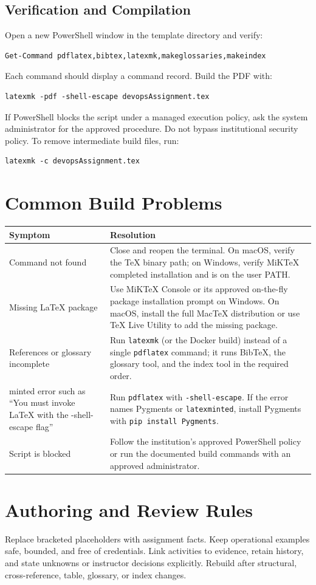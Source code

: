 \subsection{Verification and Compilation}
Open a new PowerShell window in the template directory and verify:
\begin{verbatim}
Get-Command pdflatex,bibtex,latexmk,makeglossaries,makeindex
\end{verbatim}
Each command should display a command record. Build the PDF with:
\begin{verbatim}
latexmk -pdf -shell-escape devopsAssignment.tex
\end{verbatim}
If PowerShell blocks the script under a managed execution policy, ask the
system administrator for the approved procedure. Do not bypass institutional
security policy. To remove intermediate build files, run:
\begin{verbatim}
latexmk -c devopsAssignment.tex
\end{verbatim}

\section{Common Build Problems}
\begin{tabularx}{\linewidth}{L{3.0cm}Y}
\toprule \textbf{Symptom} & \textbf{Resolution}\\ \midrule
Command not found & Close and reopen the terminal. On macOS, verify the TeX
binary path; on Windows, verify MiKTeX completed installation and is on the user PATH.\\
Missing LaTeX package & Use MiKTeX Console or its approved on-the-fly package
installation prompt on Windows. On macOS, install the full MacTeX distribution
or use TeX Live Utility to add the missing package.\\
References or glossary incomplete & Run \texttt{latexmk} (or the Docker build) instead of
a single \texttt{pdflatex} command; it runs BibTeX, the glossary tool, and the
index tool in the required order.\\
minted error such as ``You must invoke LaTeX with the -shell-escape flag'' & Run
\texttt{pdflatex} with \texttt{-shell-escape}. If the error names Pygments or
\texttt{latexminted}, install Pygments with \texttt{pip install Pygments}.\\
Script is blocked & Follow the institution's approved PowerShell policy or run
the documented build commands with an approved administrator.\\ \bottomrule
\end{tabularx}

\section{Authoring and Review Rules}
Replace bracketed placeholders with assignment facts. Keep operational examples
safe, bounded, and free of credentials. Link activities to evidence, retain
history, and state unknowns or instructor decisions explicitly. Rebuild after
structural, cross-reference, table, glossary, or index changes.
